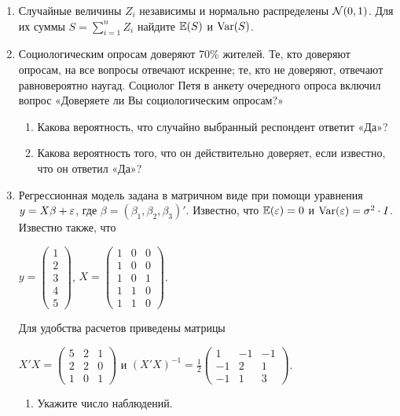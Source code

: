 \documentclass[12pt, a4paper]{article}
\begin{document}
\begin{enumerate}
\item Случайные величины $Z_i$ независимы и нормально распределены $\mathcal{N}(0,1)$. Для их суммы $S=\sum_{i=1}^n Z_i$ найдите $\mathbb{E}(S)$ и $\operatorname{Var}(S)$.
\item Социологическим опросам доверяют 70\% жителей. Те, кто доверяют
опросам, на все вопросы отвечают искренне; те, кто не доверяют, отвечают равновероятно наугад. Социолог Петя в анкету очередного опроса включил вопрос «Доверяете ли Вы социологическим опросам?»
\begin{enumerate}
\item Какова вероятность, что случайно выбранный респондент ответит «Да»?
\item Какова вероятность того, что он действительно доверяет, если известно, что он ответил
«Да»?
\end{enumerate}
\item Регрессионная модель  задана в матричном виде при помощи уравнения $y=X\beta+\varepsilon$, где $\beta=(\beta_1,\beta_2,\beta_3)'$.
Известно, что $\mathbb{E}(\varepsilon)=0$  и  $\operatorname{Var}(\varepsilon)=\sigma^2\cdot I$.
Известно также, что

$y=\left(
\begin{array}{c}
1\\
2\\
3\\
4\\
5
\end{array}\right)$,
$X=\left(\begin{array}{ccc}
1 & 0 & 0 \\
1 & 0 & 0 \\
1 & 0 & 1 \\
1 & 1 & 0 \\
1 & 1 & 0
\end{array}\right)$.


Для удобства расчетов приведены матрицы


$X'X=\left(
\begin{array}{ccc}
5 & 2 & 1\\
2 & 2 & 0\\
1 & 0 & 1
\end{array}\right)$ и $(X'X)^{-1}=\frac{1}{2}\left(
\begin{array}{ccc}
1 & -1 & -1 \\
-1 & 2 & 1 \\
-1 & 1 & 3
\end{array}\right)$.

\begin{enumerate}
\item Укажите число наблюдений.


\end{enumerate}
\end{enumerate}
\end{document}
